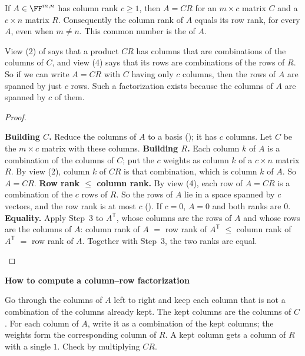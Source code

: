 \documentclass[10pt]{scrartcl}
\newenvironment{methodbox}[1]{\begin{mdframed}[style=methodstyle]\textbf{\color{NavyBlue}#1}\par\vspace{2pt}}{\end{mdframed}}
\begin{document}
\begin{proposition*}
  If $A\in\FF^{m,n}$ has column rank $c\ge1$, then $A=CR$ for an $m\times c$ matrix $C$ and a $c\times n$ matrix $R$. Consequently the column rank of $A$ equals its row rank, for every $A$, even when $m\ne n$. This common number is the  of $A$.
\end{proposition*}
\begin{ideabox}
  View (2) of  says that a product $CR$ has columns that are combinations of the columns of $C$, and view (4) says that its rows are combinations of the rows of $R$. So if we can write $A=CR$ with $C$ having only $c$ columns, then the rows of $A$ are spanned by just $c$ rows. Such a factorization exists because the columns of $A$ are spanned by $c$ of them.
\end{ideabox}
\begin{proof}
  \begin{steps}
    \ii \textbf{Building $C$.} Reduce the columns of $A$ to a basis (); it has $c$ columns. Let $C$ be the $m\times c$ matrix with these columns.
    \ii \textbf{Building $R$.} Each column $k$ of $A$ is a combination of the columns of $C$; put the $c$ weights as column $k$ of a $c\times n$ matrix $R$. By view (2), column $k$ of $CR$ is that combination, which is column $k$ of $A$. So $A=CR$.
    \ii \textbf{Row rank $\le$ column rank.} By view (4), each row of $A=CR$ is a combination of the $c$ rows of $R$. So the rows of $A$ lie in a space spanned by $c$ vectors, and the row rank is at most $c$ (). If $c=0$, $A=0$ and both ranks are $0$.
    \ii \textbf{Equality.} Apply Step~3 to $A^{\mathsf T}$, whose columns are the rows of $A$ and whose rows are the columns of $A$: column rank of $A$ $=$ row rank of $A^{\mathsf T}$ $\le$ column rank of $A^{\mathsf T}$ $=$ row rank of $A$. Together with Step~3, the two ranks are equal.
  \end{steps}
\end{proof}

\begin{methodbox}{How to compute a column--row factorization}
  \begin{steps}
    \ii Go through the columns of $A$ left to right and keep each column that is not a combination of the columns already kept. The kept columns are the columns of $C$.
    \ii For each column of $A$, write it as a combination of the kept columns; the weights form the corresponding column of $R$. A kept column gets a column of $R$ with a single $1$.
    \ii Check by multiplying $CR$.
  \end{steps}
\end{methodbox}
\end{document}
